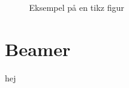 \documentclass{article}
\begin{document}
\begin{figure}[h]
	\centering
	\caption{Eksempel på en tikz figur}\label{fig:tikz}
\end{figure}

\section{Beamer}
hej\cite{attention}

\newpage
\appendix

{}
\end{document}
